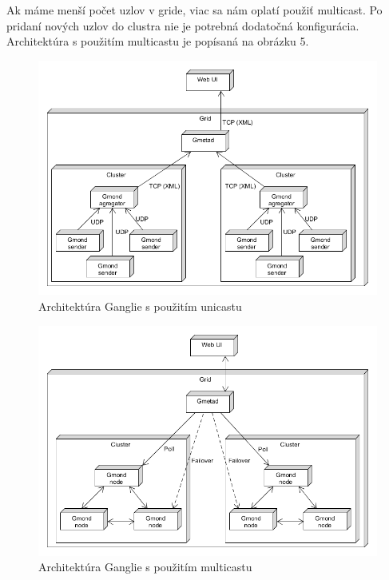 \documentclass[a4paper, upjsfrontpage, thesismargins, thesislinespacing]{rnthesis}
\begin{document}
Ak máme menší počet uzlov v gride, viac sa nám oplatí použiť multicast.
Po pridaní nových uzlov do clustra nie je potrebná dodatočná konfigurácia.
Architektúra s použitím multicastu je popísaná na obrázku 5.

\begin{figure}
	\begin{center}
		\includegraphics[scale=0.55]{ganglia-architecture.png}
	\end{center}
	\caption{Architektúra Ganglie s použitím unicastu}
\end{figure}

\begin{figure}
	\begin{center}
		\includegraphics[scale=0.55]{ganglia-architecture-multicast.png}
	\end{center}
	\caption{Architektúra Ganglie s použitím multicastu}
\end{figure}
\end{document}
